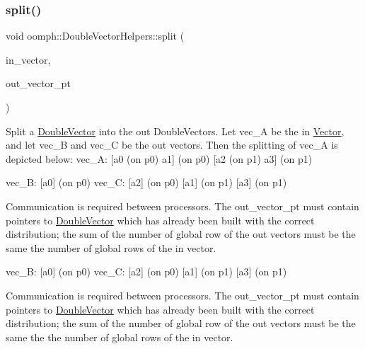 \mbox{\label{namespaceoomph_1_1DoubleVectorHelpers_aa6675e6e16aa28b54245bb85b3e918ee}} 
\subsubsection{\texorpdfstring{split()}{split()}\hspace{0.1cm}{\footnotesize\ttfamily [1/2]}}
{\footnotesize\ttfamily void oomph\+::\+Double\+Vector\+Helpers\+::split (\begin{DoxyParamCaption}\item[{const \hyperlink{classoomph_1_1DoubleVector}{Double\+Vector} \&}]{in\+\_\+vector,  }\item[{\hyperlink{classoomph_1_1Vector}{Vector}$<$ \hyperlink{classoomph_1_1DoubleVector}{Double\+Vector} $\ast$$>$ \&}]{out\+\_\+vector\+\_\+pt }\end{DoxyParamCaption})}



Split a \hyperlink{classoomph_1_1DoubleVector}{Double\+Vector} into the out Double\+Vectors. Let vec\+\_\+A be the in \hyperlink{classoomph_1_1Vector}{Vector}, and let vec\+\_\+B and vec\+\_\+C be the out vectors. Then the splitting of vec\+\_\+A is depicted below\+: vec\+\_\+A\+: \mbox{[}a0 (on p0) a1\mbox{]} (on p0) \mbox{[}a2 (on p1) a3\mbox{]} (on p1) 

vec\+\_\+B\+: \mbox{[}a0\mbox{]} (on p0) vec\+\_\+C\+: \mbox{[}a2\mbox{]} (on p0) \mbox{[}a1\mbox{]} (on p1) \mbox{[}a3\mbox{]} (on p1)

Communication is required between processors. The out\+\_\+vector\+\_\+pt must contain pointers to \hyperlink{classoomph_1_1DoubleVector}{Double\+Vector} which has already been built with the correct distribution; the sum of the number of global row of the out vectors must be the same the number of global rows of the in vector.

vec\+\_\+B\+: \mbox{[}a0\mbox{]} (on p0) vec\+\_\+C\+: \mbox{[}a2\mbox{]} (on p0) \mbox{[}a1\mbox{]} (on p1) \mbox{[}a3\mbox{]} (on p1)

Communication is required between processors. The out\+\_\+vector\+\_\+pt must contain pointers to \hyperlink{classoomph_1_1DoubleVector}{Double\+Vector} which has already been built with the correct distribution; the sum of the number of global row of the out vectors must be the same the the number of global rows of the in vector. 


